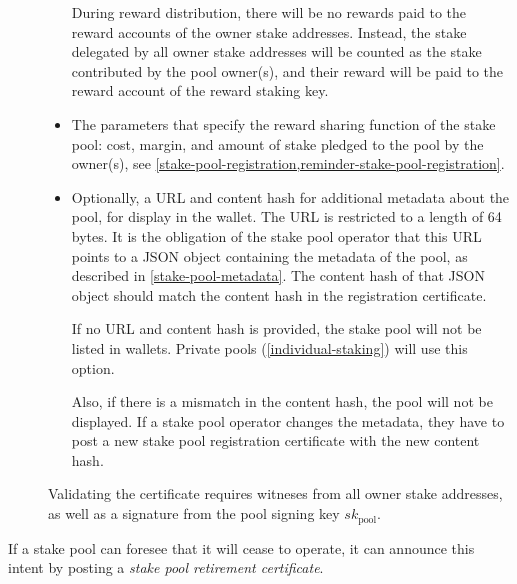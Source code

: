 \documentclass[11pt,a4paper]{article}
\begin{document}
\begin{description}
\begin{itemize}
  During reward distribution, there will be no rewards paid to the reward
  accounts of the owner stake addresses. Instead, the stake delegated by all owner
  stake addresses will be counted as the stake contributed by the pool owner(s),
  and their reward will be paid to the reward account of the reward staking key.

\item
  The parameters that specify the reward sharing function of the stake
  pool: cost, margin, and amount of stake pledged to the pool by the
  owner(s), see \cref{stake-pool-registration,reminder-stake-pool-registration}.

\item
  Optionally, a URL and content hash for additional metadata about the pool, for
  display in the wallet. The URL is restricted to a length of 64 bytes. It is
  the obligation of the stake pool operator that this URL points to a JSON
  object containing the metadata of the pool, as described in
  \cref{stake-pool-metadata}. The content hash of that JSON object should match
  the content hash in the registration certificate.

  If no URL and content hash is provided, the stake pool will not be listed in
  wallets. Private pools (\cref{individual-staking}) will use this option.

  Also, if there is a mismatch in the content hash, the pool will not be
  displayed. If a stake pool operator changes the metadata, they have to post a
  new stake pool registration certificate with the new content hash.
\end{itemize}

Validating the certificate requires witneses from all owner stake addresses, as
well as a signature from the pool signing key \(sk_\text{pool}\).

\end{description}

If a stake pool can foresee that it will cease to operate, it can
announce this intent by posting a \emph{stake pool retirement
certificate}.
\end{document}
